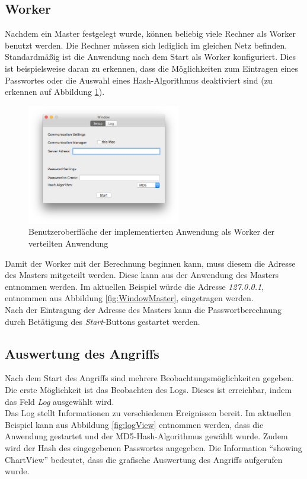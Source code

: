 \subsection{Worker}
\label{WorkerGUI}
Nachdem ein Master festgelegt wurde, können beliebig viele Rechner als Worker benutzt werden. Die Rechner müssen sich lediglich im gleichen Netz befinden. \\
Standardmäßig ist die Anwendung nach dem Start als Worker konfiguriert. Dies ist beispielsweise daran zu erkennen, dass die Möglichkeiten zum Eintragen eines Passwortes oder die Auswahl eines Hash-Algorithmus deaktiviert sind (zu erkennen auf Abbildung \ref{fig:WindowWorker}). \\
\begin{figure}[!ht]
	\centering
		\includegraphics[natwidth=1200pt, natheight=349pt, width=0.6\textwidth]{images/WindowWorker.png}
		\caption{Benutzeroberfläche der implementierten Anwendung als Worker der verteilten Anwendung}
	\label{fig:WindowWorker}
\end{figure}
Damit der Worker mit der Berechnung beginnen kann, muss diesem die Adresse des Masters mitgeteilt werden. Diese kann aus der Anwendung des Masters entnommen werden. Im aktuellen Beispiel würde die Adresse \emph{127.0.0.1}, entnommen aus Abbildung \ref{fig:WindowMaster}, eingetragen werden.\\
Nach der Eintragung der Adresse des Masters kann die Passwortberechnung durch Betätigung des \emph{Start}-Buttons gestartet werden. 



\subsection{Auswertung des Angriffs}
Nach dem Start des Angriffs sind mehrere Beobachtungsmöglichkeiten gegeben. Die erste Möglichkeit ist das Beobachten des Logs. Dieses ist erreichbar, indem das Feld \emph{Log} ausgewählt wird.\\
Das Log stellt Informationen zu verschiedenen Ereignissen bereit. Im aktuellen Beispiel kann aus Abbildung \ref{fig:logView} entnommen werden, dass die Anwendung gestartet und der MD5-Hash-Algorithmus gewählt wurde. Zudem wird der Hash des eingegebenen Passwortes angegeben. Die Information \enquote{showing ChartView} bedeutet, dass die grafische Auswertung des Angriffs aufgerufen wurde.

